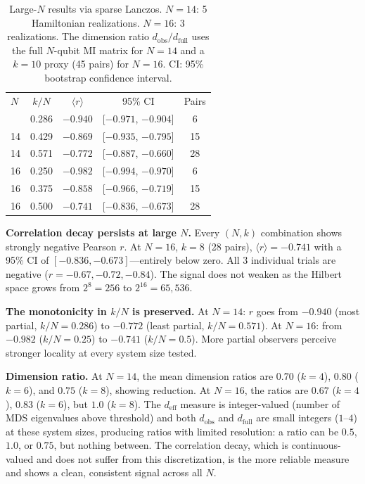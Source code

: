\documentclass[aps,pra,twocolumn,superscriptaddress]{revtex4-2}
\begin{document}
\begin{table}[t]
\caption{Large-$N$ results via sparse Lanczos. $N = 14$: 5 Hamiltonian realizations. $N = 16$: 3 realizations. The dimension ratio $d_\text{obs}/d_\text{full}$ uses the full $N$-qubit MI matrix for $N = 14$ and a $k = 10$ proxy (45 pairs) for $N = 16$. CI: 95\% bootstrap confidence interval.}
\label{tab:large_n}
\begin{ruledtabular}
\begin{tabular}{lcccc}
$N$ & $k/N$ & $\langle r \rangle$ & 95\% CI & Pairs \\
\colrule
14 & 0.286 & $-0.940$ & [$-0.971$, $-0.904$] & 6 \\
14 & 0.429 & $-0.869$ & [$-0.935$, $-0.795$] & 15 \\
14 & 0.571 & $-0.772$ & [$-0.887$, $-0.660$] & 28 \\
16 & 0.250 & $-0.982$ & [$-0.994$, $-0.970$] & 6 \\
16 & 0.375 & $-0.858$ & [$-0.966$, $-0.719$] & 15 \\
16 & 0.500 & $-0.741$ & [$-0.836$, $-0.673$] & 28 \\
\end{tabular}
\end{ruledtabular}
\end{table}

\textbf{Correlation decay persists at large $N$.}
Every $(N, k)$ combination shows strongly negative Pearson $r$. At $N = 16$, $k = 8$ (28 pairs), $\langle r \rangle = -0.741$ with a 95\% CI of $[-0.836, -0.673]$---entirely below zero. All 3 individual trials are negative ($r = -0.67, -0.72, -0.84$). The signal does not weaken as the Hilbert space grows from $2^8 = 256$ to $2^{16} = 65{,}536$.

\textbf{The monotonicity in $k/N$ is preserved.}
At $N = 14$: $r$ goes from $-0.940$ (most partial, $k/N = 0.286$) to $-0.772$ (least partial, $k/N = 0.571$). At $N = 16$: from $-0.982$ ($k/N = 0.25$) to $-0.741$ ($k/N = 0.5$). More partial observers perceive stronger locality at every system size tested.

\textbf{Dimension ratio.}
At $N = 14$, the mean dimension ratios are $0.70$ ($k = 4$), $0.80$ ($k = 6$), and $0.75$ ($k = 8$), showing reduction. At $N = 16$, the ratios are $0.67$ ($k = 4$), $0.83$ ($k = 6$), but $1.0$ ($k = 8$). The $d_\text{eff}$ measure is integer-valued (number of MDS eigenvalues above threshold) and both $d_\text{obs}$ and $d_\text{full}$ are small integers ($1$--$4$) at these system sizes, producing ratios with limited resolution: a ratio can be $0.5$, $1.0$, or $0.75$, but nothing between. The correlation decay, which is continuous-valued and does not suffer from this discretization, is the more reliable measure and shows a clean, consistent signal across all $N$.
\end{document}
